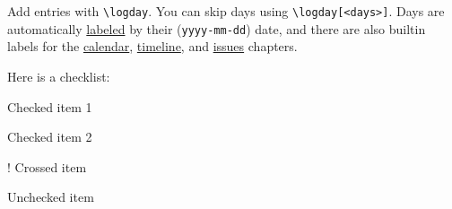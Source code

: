 \documentclass[%
	raggedright, %
]{journal}
\author{Alice Atwood \and Bob Benston}
\begin{document}
\maketitle

\tableofcontents %


\timelines %

\listofissues %



\logday %
Add entries with \verb|\logday|. You can skip days using \verb|\logday[<days>]|.
Days are automatically \hyperref[2022-12-02]{labeled} by their ({\tt yyyy-mm-dd}) date,
and there are also builtin labels for the \hyperref[ch:calendar]{calendar},
\hyperref[ch:timeline]{timeline}, and \hyperref[ch:issues]{issues} chapters.


\logday[2] %
Here is a checklist:
\begin{checklist}
	\item* Checked item 1
	\item* Checked item 2
	\item! Crossed item
	\item Unchecked item
\end{checklist}

\end{document}
